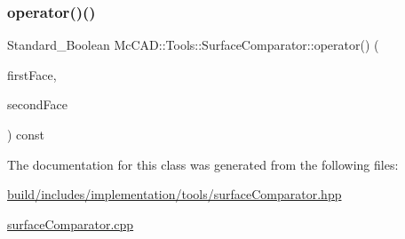\subsubsection{\texorpdfstring{operator()()}{operator()()}\hspace{0.1cm}{\footnotesize\ttfamily [2/2]}}
{\footnotesize\ttfamily Standard\+\_\+\+Boolean Mc\+C\+A\+D\+::\+Tools\+::\+Surface\+Comparator\+::operator() (\begin{DoxyParamCaption}\item[{const Topo\+D\+S\+\_\+\+Face \&}]{first\+Face,  }\item[{const Topo\+D\+S\+\_\+\+Face \&}]{second\+Face }\end{DoxyParamCaption}) const}



The documentation for this class was generated from the following files\+:\begin{DoxyCompactItemize}
\item 
\hyperlink{build_2includes_2implementation_2tools_2surfaceComparator_8hpp}{build/includes/implementation/tools/surface\+Comparator.\+hpp}\item 
\hyperlink{surfaceComparator_8cpp}{surface\+Comparator.\+cpp}\end{DoxyCompactItemize}
